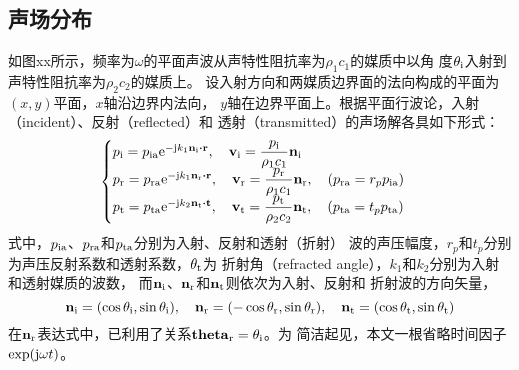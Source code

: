 \documentclass[UTF8]{ctexbook}
\begin{document}
\subsection{声场分布}
如图xx所示，频率为$\omega$的平面声波从声特性阻抗率为$\rho_1c_1$的媒质中以角
度$\theta_\text{i}$入射到声特性阻抗率为$\rho_2c_2$的媒质上。
设入射方向和两媒质边界面的法向构成的平面为$(x,y)$平面，$x$轴沿边界内法向，
$y$轴在边界平面上。根据平面行波论，入射（incident）、反射（reflected）和
透射（transmitted）的声场解各具如下形式：
\begin{equation}
	\label{eq:totalref_pressure}
	\begin{cases}
	p\st{i} = p\st{ia} \me^{-\mj k_1 \vb{n}\st{i} \vdot \vb{r}}
	\qc \vb{v}\st{i} = \dfrac{p\st{i}}{\rho_1c_1} \vb{n}\st{i}\\
	p\st{r} = p\st{ra} \me^{-\mj k_1 \vb{n}\st{r} \vdot \vb{r}}
	\qc \vb{v}\st{r} = \dfrac{p\st{r}}{\rho_1c_1} \vb{n}\st{r}
	\qc (p\st{ra} = r_p p\st{ia}) \\
	p\st{t} = p\st{ta} \me^{-\mj k_2 \vb{n}\st{t} \vdot \vb{t}}
	\qc \vb{v}\st{t} = \dfrac{p\st{t}}{\rho_2c_2} \vb{n}\st{t}
	\qc (p\st{ta} = t_p p\st{ta}) 
	\end{cases}
\end{equation}
式中，$p_\text{ia}$、$p_\text{ra}$和$p_\text{ta}$分别为入射、反射和透射（折射）
波的声压幅度，$r_p$和$t_p$分别为声压反射系数和透射系数，$\theta_\text{t}$为
折射角（refracted angle），$k_1$和$k_2$分别为入射和透射媒质的波数，
而$\vb{n}_\text{i}$、$\vb{n}_\text{r}$和$\vb{n}_\text{t}$则依次为入射、反射和
折射波的方向矢量，
\begin{equation}
	\vb{n}\st{i}=(\cos \theta\st{i}, \sin \theta\st{i})\qc 
	\vb{n}\st{r}=(-\cos \theta\st{r}, \sin \theta\st{r})\qc 
	\vb{n}\st{t}=(\cos \theta\st{t}, \sin \theta\st{t})
\end{equation}
在$\vb{n}_\text{r}$表达式中，已利用了关系$\vb{theta}_\text{r}=\theta_\text{i}$。为
简洁起见，本文一根省略时间因子$\exp(\mathrm{j} \omega t)$。
\end{document}

